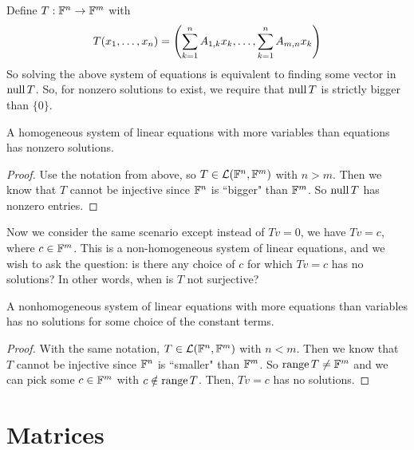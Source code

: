 Define $T: \mathbb F^n \to \mathbb F^m$ with
\[ T(x_1, \dots, x_n) = \pqty{\sum_{k=1}^n A_{1,k}x_k, \dots, \sum_{k=1}^n A_{m,n}x_k }\]
So solving the above system of equations is equivalent to finding some vector in $\operatorname{null} T$. So, for nonzero solutions to exist, we require that $\operatorname{null} T$ is strictly bigger than $\{0\}$.
\begin{theorem}
    A homogeneous system of linear equations with more variables than equations has nonzero solutions.
\end{theorem}
\begin{proof}
    Use the notation from above, so $T \in \mathcal{L}(\mathbb F^n, \mathbb F^m)$ with $n>m$. Then we know that $T$ cannot be injective since $\mathbb F^n$ is ``bigger" than $\mathbb F^m$. So $\operatorname{null} T$ has nonzero entries. 
\end{proof}
Now we consider the same scenario except instead of $Tv = 0$, we have $Tv = c$, where $c\in \mathbb F^m$. This is a non-homogeneous system of linear equations, and we wish to ask the question: is there any choice of $c$ for which $Tv = c$ has no solutions? In other words, when is $T$ not surjective?
\begin{theorem}
    A nonhomogeneous system of linear equations with more equations than variables has no solutions for some choice of the constant terms.
\end{theorem}
\begin{proof}
    With the same notation, $T\in\mathcal{L}(\mathbb F^n, \mathbb F^m)$ with $n<m$. Then we know that $T$ cannot be injective since $\mathbb F^n$ is ``smaller" than $\mathbb F^m$. So $\operatorname{range} T \ne \mathbb F^m$ and we can pick some $c\in \mathbb F^m$ with $c\notin \operatorname{range} T$. Then, $Tv = c$ has no solutions.
\end{proof}
\section{Matrices}

